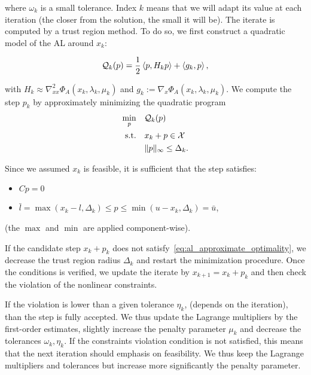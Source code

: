 \documentclass[10pt]{article}
\begin{document}
	where $\omega_k$ is a small tolerance. Index $k$ means that we will adapt its value at each iteration (the closer from the solution, the small it will be). The iterate is computed by a trust region method. To do so, we first construct a quadratic model of the AL around $x_k$:
	
	\begin{equation}\label{eq:quadratic_al}
		{\mathcal{Q}}_k(p) = \dfrac{1}{2}\left\langle {p} , {H_kp} \right\rangle + \left\langle {g_k} , {p} \right\rangle,
	\end{equation}
	
	with $H_k\approx\nabla^2_{xx} \Phi_A(x_k,\lambda_k,\mu_k)$  and $g_k:=\nabla_x \Phi_A(x_k,\lambda_k,\mu_k)$. We compute the step $p_k$ by approximately minimizing the quadratic program
	\begin{equation}\label{eq:quadratic_subpb} 
		\begin{aligned}
			\min_{p} \quad& {\mathcal{Q}}_k(p)  \\
			\text{s.t.}  \quad &  x_k+p\in {\mathcal{X}}\\
			& \|p\|_\infty \le \Delta_k.
		\end{aligned}	
	\end{equation}
	
	Since we assumed $x_k$ is feasible, it is sufficient that the step satisfies:
	\begin{itemize}
		\item \(Cp=0\)
		\item $ \bar{l} = \max(x_k-l,\Delta_k) \le p \le \min (u-x_k,\Delta_k) = \bar{u}$,
	\end{itemize}
	(the $\max$ and $\min$ are applied component-wise).
	
	If the candidate step $x_k+p_k$ does not satisfy~\eqref{eq:al_approximate_optimality}, we decrease the trust region radius $\Delta_k$ and restart the minimization procedure.
	Once the conditions is verified, we update the iterate by $x_{k+1}=x_k+p_k$ and then check the violation of the nonlinear constraints. 
	
	If the violation is lower than a given tolerance $\eta_k$, (depends on the iteration), than the step is fully accepted. We thus update the Lagrange multipliers by the first-order estimates, slightly increase the penalty parameter $\mu_k$ and decrease the tolerances $\omega_k, \eta_k$. If the constraints violation condition is not satisfied, this means that the next iteration should emphasis on feasibility. We thus keep the Lagrange multipliers and tolerances but increase more significantly the penalty parameter. 
	
\end{document}
